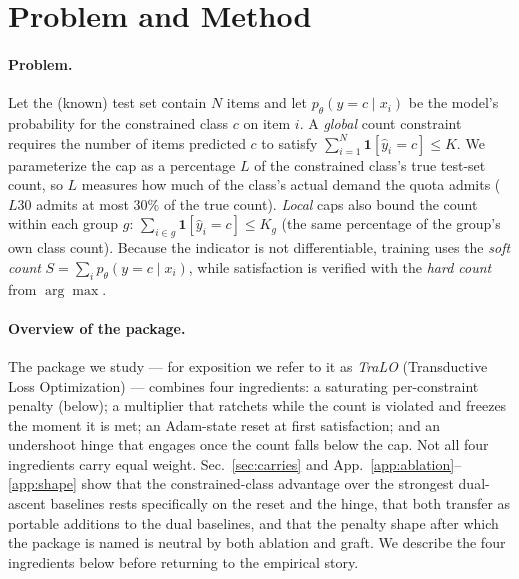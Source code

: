 \documentclass[10pt]{article}
\begin{document}
\section{Problem and Method}
\label{sec:method}

\paragraph{Problem.}
Let the (known) test set contain $N$ items and let $p_\theta(y=c\mid x_i)$ be
the model's probability for the constrained class $c$ on item $i$. A
\emph{global} count constraint requires the number of items predicted $c$ to
satisfy $\sum_{i=1}^{N}\mathbf{1}[\hat y_i = c] \le K$. We parameterize the
cap as a percentage $L$ of the constrained class's true test-set count, so
$L$ measures how much of the class's actual demand the quota admits ($L30$
admits at most $30\%$ of the true count). \emph{Local} caps also bound the
count within each group $g$: $\sum_{i\in g}\mathbf{1}[\hat y_i=c]\le K_g$
(the same percentage of the group's own class count). Because the indicator
is not differentiable, training uses the \emph{soft count}
$S=\sum_i p_\theta(y=c\mid x_i)$, while satisfaction is verified with the
\emph{hard count} from $\arg\max$.

\paragraph{Overview of the package.}
The package we study --- for exposition we refer to it as \emph{TraLO}
(Transductive Loss Optimization) --- combines four ingredients: a saturating
per-constraint penalty (below); a multiplier that ratchets while the count is
violated and freezes the moment it is met; an Adam-state reset at first
satisfaction; and an undershoot hinge that engages once the count falls below
the cap. Not all four ingredients carry equal weight. Sec.~\ref{sec:carries}
and App.~\ref{app:ablation}--\ref{app:shape} show that the constrained-class
advantage over the strongest dual-ascent baselines rests specifically on the
reset and the hinge, that both transfer as portable additions to the dual
baselines, and that the penalty shape after which the package is named is
neutral by both ablation and graft. We describe the four ingredients below
before returning to the empirical story.
\end{document}
